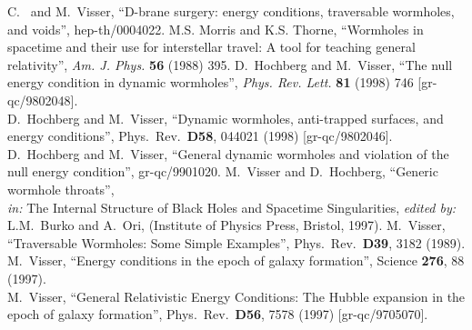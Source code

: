 \documentclass[a4paper,12pt]{article}
\begin{document}
\begin{thebibliography}{99}
C.~{\Barcelo} and M.~Visser,
``D-brane surgery: energy conditions, traversable wormholes, and voids'',
hep-th/0004022.
M.S. Morris and K.S. Thorne, 
``Wormholes in spacetime and their use for interstellar travel:
A tool for teaching general relativity'',
{\em Am. J. Phys.} {\bf 56} (1988) 395.   
D.~Hochberg and M.~Visser, 
``The null energy condition in dynamic wormholes'',
{\em Phys. Rev. Lett.} {\bf 81} (1998) 746 [gr-qc/9802048].
\\
D.~Hochberg and M.~Visser,
``Dynamic wormholes, anti-trapped surfaces, and energy conditions'',
Phys.\ Rev.\  {\bf D58}, 044021 (1998)
[gr-qc/9802046].
\\
D.~Hochberg and M.~Visser,
``General dynamic wormholes and violation of the null energy condition'',
gr-qc/9901020.
M.~Visser and D.~Hochberg,
``Generic wormhole throats'',
\\
{\sl in:} The Internal Structure of Black Holes and Spacetime Singularities,
{\sl edited by:} L.M.~Burko and A.~Ori,
(Institute of Physics Press, Bristol, 1997).
M.~Visser,
``Traversable Wormholes: Some Simple Examples'',
Phys.\ Rev.\  {\bf D39}, 3182 (1989).
M.~Visser,
``Energy conditions in the epoch of galaxy formation'',
Science {\bf 276}, 88 (1997).
\\
M.~Visser,
``General Relativistic Energy Conditions: 
The Hubble expansion in the epoch of galaxy formation'',
Phys.\ Rev.\  {\bf D56}, 7578 (1997)
[gr-qc/9705070].
\end{thebibliography} 
\end{document}
